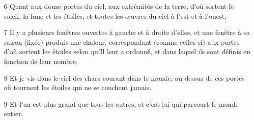 \par 6 Quant aux douze portes du ciel, aux extrémités de la terre, d'où sortent le soleil, la lune et les étoiles, et toutes les œuvres du ciel à l'est et à l'ouest,
\par 7 Il y a plusieurs fenêtres ouvertes à gauche et à droite d'elles, et une fenêtre à sa saison (fixée) produit une chaleur, correspondant (comme celles-ci) aux portes d'où sortent les étoiles selon qu'Il leur a ordonné, et dans lequel ils sont définis en fonction de leur nombre.
\par 8 Et je vis dans le ciel des chars courant dans le monde, au-dessus de ces portes où tournent les étoiles qui ne se couchent jamais.
\par 9 Et l'un est plus grand que tous les autres, et c'est lui qui parcourt le monde entier.


